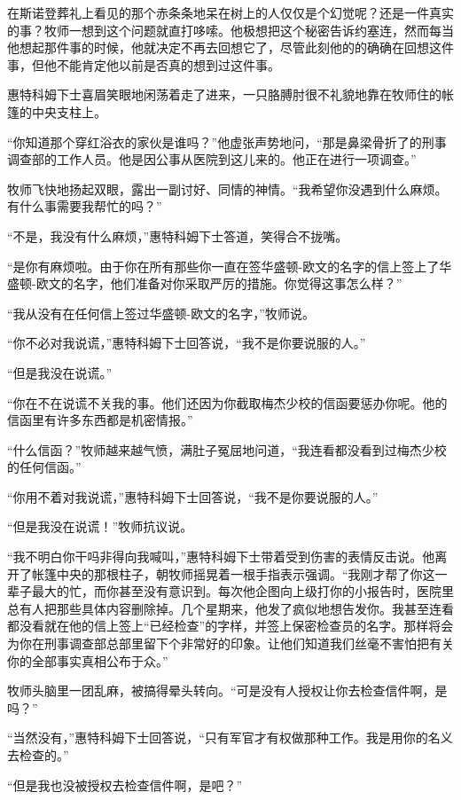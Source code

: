     在斯诺登葬礼上看见的那个赤条条地呆在树上的人仅仅是个幻觉呢？还是一件真实的事？牧师一想到这个问题就直打哆嗦。他极想把这个秘密告诉约塞连，然而每当他想起那件事的时候，他就决定不再去回想它了，尽管此刻他的的确确在回想这件事，但他不能肯定他以前是否真的想到过这件事。

    惠特科姆下士喜眉笑眼地闲荡着走了进来，一只胳膊肘很不礼貌地靠在牧师住的帐篷的中央支柱上。

    “你知道那个穿红浴衣的家伙是谁吗？”他虚张声势地问，“那是鼻梁骨折了的刑事调查部的工作人员。他是因公事从医院到这儿来的。他正在进行一项调查。”

    牧师飞快地扬起双眼，露出一副讨好、同情的神情。“我希望你没遇到什么麻烦。有什么事需要我帮忙的吗？”

    “不是，我没有什么麻烦，”惠特科姆下士答道，笑得合不拢嘴。

    “是你有麻烦啦。由于你在所有那些你一直在签华盛顿-欧文的名字的信上签上了华盛顿-欧文的名字，他们准备对你采取严厉的措施。你觉得这事怎么样？”

    “我从没有在任何信上签过华盛顿-欧文的名字，”牧师说。

    “你不必对我说谎，”惠特科姆下士回答说，“我不是你要说服的人。”

    “但是我没在说谎。”

    “你在不在说谎不关我的事。他们还因为你截取梅杰少校的信函要惩办你呢。他的信函里有许多东西都是机密情报。”

    “什么信函？”牧师越来越气愤，满肚子冤屈地问道，“我连看都没看到过梅杰少校的任何信函。”

    “你用不着对我说谎，”惠特科姆下士回答说，“我不是你要说服的人。”

    “但是我没在说谎！”牧师抗议说。

    “我不明白你干吗非得向我喊叫，”惠特科姆下士带着受到伤害的表情反击说。他离开了帐篷中央的那根柱子，朝牧师摇晃着一根手指表示强调。“我刚才帮了你这一辈子最大的忙，而你甚至没有意识到。每次他企图向上级打你的小报告时，医院里总有人把那些具体内容删除掉。几个星期来，他发了疯似地想告发你。我甚至连看都没看就在他的信上签上“已经检查”的字样，并签上保密检查员的名字。那样将会为你在刑事调查部总部里留下个非常好的印象。让他们知道我们丝毫不害怕把有关你的全部事实真相公布于众。”

    牧师头脑里一团乱麻，被搞得晕头转向。“可是没有人授权让你去检查信件啊，是吗？”

    “当然没有，”惠特科姆下士回答说，“只有军官才有权做那种工作。我是用你的名义去检查的。”

    “但是我也没被授权去检查信件啊，是吧？”

